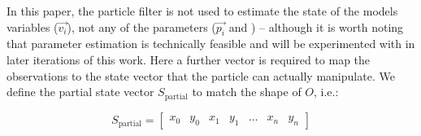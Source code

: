 In this paper, the particle filter is not used to estimate the state of the models variables ($\overrightarrow{v_i}$), not any of the parameters ($\overrightarrow{p_i}$ and ) -- although it is worth noting that parameter estimation is technically feasible and will be experimented with in later iterations of this work. Here a further vector is required to map the observations to the state vector that the particle can actually manipulate. We define the partial state vector $S_\textrm{partial}$ to match the shape of $O$, i.e.:

\begin{equation}
  S_\textrm{partial}  = \left[ \begin{array}{ccccccc}
x_0 & y_0 & x_1 & y_1 & \dots & x_n & y_n 
\end{array} \right]
\end{equation} 




